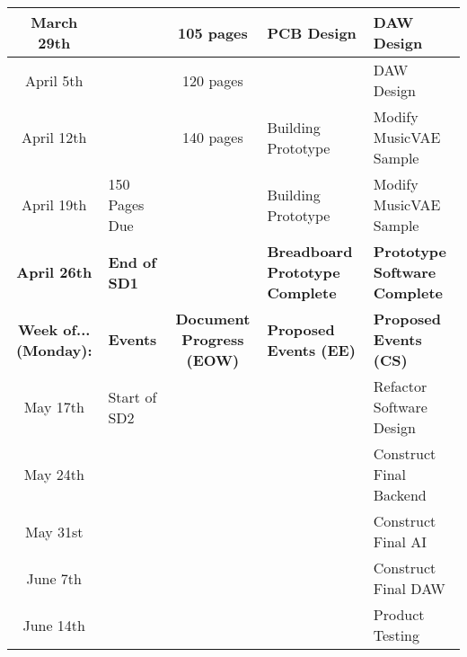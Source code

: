 \begin{table}[h!]
{\begin{tabular}{|S|L|S|L|L|}
  March 29th                    &                       & 105 pages                        & PCB Design                             & DAW Design                                           \\ \hline
  April 5th                     &                       & 120 pages                        &                                        & DAW Design                                           \\ \hline
  April 12th                    &                       & 140 pages                        & Building Prototype                     & Modify MusicVAE Sample                               \\ \hline
  April 19th                    & 150 Pages Due         &                                  & Building Prototype                     & Modify MusicVAE Sample                               \\ \hline
  \textbf{April 26th}           & \textbf{End of SD1}   & \textbf{}                        & \textbf{Breadboard Prototype Complete} & \textbf{Prototype Software Complete}                 \\ \hline
  \textbf{Week of... (Monday):} & \textbf{Events}       & \textbf{Document Progress (EOW)} & \textbf{Proposed Events (EE)}          & \textbf{Proposed Events (CS)}                        \\ \hline
  May 17th                      & Start of SD2          &                                  &                                        & Refactor Software Design                             \\ \hline
  May 24th                      &                       &                                  &                                        & Construct Final Backend                              \\ \hline
  May 31st                      &                       &                                  &                                        & Construct Final AI                                   \\ \hline
  June 7th                      &                       &                                  &                                        & Construct Final DAW                                  \\ \hline
  June 14th                     &                       &                                  &                                        & Product Testing                                      \\ \hline

\end{tabular}}
\end{table}
